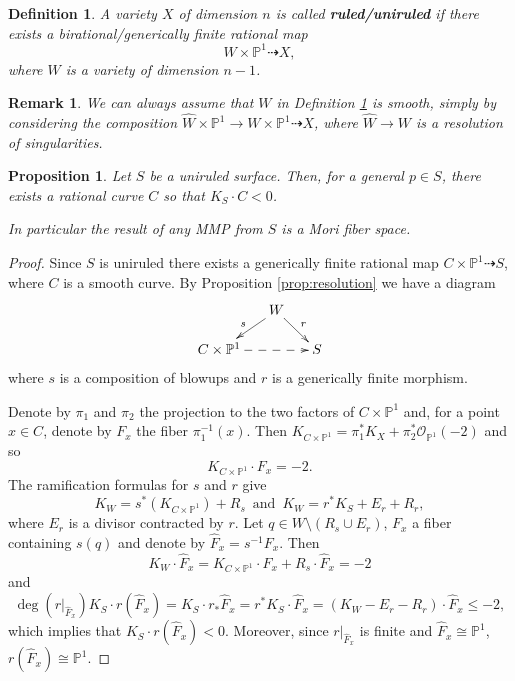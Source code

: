\documentclass[a4paper,11pt]{amsart}
\newtheorem{proposition}[theorem]{Proposition}
\newtheorem{remark}[theorem]{Remark}
\newtheorem{definition}[theorem]{Definition}
\def\deg{\operatorname{deg}}
\newcommand{\OO}{\mathcal{O}}
\newcommand{\PP}{\mathbb{P}}
\newcommand{\isom}{\cong}
\newcommand{\rmap}{\dashrightarrow}
\begin{document}
\begin{definition}\label{def:(uni)ruled}
	A variety $X$ of dimension $n$ is called \textbf{ruled/uniruled} if there exists a birational/generically finite rational map
	\[
	W \times \PP^1 \rmap X,
	\]
	where $W$ is a variety of dimension $n-1$.
\end{definition}

\begin{remark}
	We can always assume that $W$ in Definition \ref{def:(uni)ruled} is smooth, simply by considering the composition $\widehat{W}\times \PP^1 \to W \times \PP^1 \rmap X$, where $\widehat{W} \to W$ is a resolution of singularities.
\end{remark}


\begin{proposition}
	Let $S$ be a uniruled surface.
	Then, for a general $p\in S$, there exists a rational curve $C$ so that $K_S \cdot C < 0$.
	
	In particular the result of any MMP from $S$ is a Mori fiber space.
\end{proposition}

\begin{proof}
	Since $S$ is uniruled there exists a generically finite rational map $C \times \PP^1 \rmap S$, where $C$ is a smooth curve.
	By Proposition \ref{prop:resolution} we have a diagram
	\[
	\xymatrix@R=.5cm@C=.5cm{
		&W \ar[ld]_s \ar[rd]^r \\
	C \times \PP^1 \ar@{-->}[rr] && S 
	}
	\]
	where $s$ is a composition of blowups and $r$ is a generically finite morphism.
	
	Denote by $\pi_1$ and $\pi_2$ the projection to the two factors of $C \times \PP^1$	and, for a point $x \in C$, denote by $F_x$ the fiber $\pi_1^{-1}(x)$.
	Then $K_{C \times \PP^1} = \pi_1^*K_X + \pi_2^*\OO_{\PP^1}(-2)$ and so
	\[
	K_{C \times \PP^1} \cdot F_x = -2.
	\]
	The ramification formulas for $s$ and $r$ give
	\[
	K_W = s^*(K_{C \times \PP^1}) + R_s \, \text{ and } \, K_W = r^*K_S + E_r + R_r,
	\]
	where $E_r$ is a divisor contracted by $r$.
	Let $q \in W \setminus (R_s \cup E_r)$, $F_x$ a fiber containing $s(q)$ and denote by $\widehat{F}_x = s^{-1}F_x$.
	Then 
	\[
	K_W \cdot \widehat{F}_x = K_{C \times \PP^1}\cdot F_x + R_s \cdot \widehat{F}_x = -2
	\]
	and 
	\[
	\deg(r|_{\widehat{F}_x})K_S\cdot r(\widehat{F}_x) = K_S\cdot r_*\widehat{F}_x = r^*K_S \cdot \widehat{F}_x = (K_W - E_r - R_r)\cdot \widehat{F}_x \leq -2,
	\]
	which implies that $K_S \cdot r(\widehat{F}_x) < 0$.
	Moreover, since $r|_{\widehat{F}_x}$ is finite and $\widehat{F}_x \isom \PP^1$, $r(\widehat{F}_x) \isom \PP^1$.
\end{proof}
\end{document}
